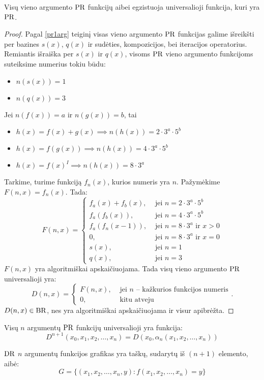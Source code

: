 \begin{prop}
  Visų vieno argumento $\mathop{\text{PR}}$ funkcijų aibei egzistuoja universalioji
  funkcija, kuri yra $\mathop{\text{PR}}$.
  \begin{proof}
    Pagal \ref{pr1arg} teiginį visas vieno argumento $\mathop{\text{PR}}$ funkcijas
    galime išreikšti per bazines $s(x)$, $q(x)$ ir sudėties, kompozicijos,
    bei iteracijos operatorius.
    Remiantis išraiška per $s(x)$ ir $q(x)$, visoms $\mathop{\text{PR}}$ vieno argumento
    funkcijoms suteiksime numerius tokiu būdu:
    \begin{itemize}
      \item $n(s(x)) = 1$
      \item $n(q(x)) = 3$
    \end{itemize}
    Jei $n(f(x)) = a$ ir $n(g(x)) = b$, tai
    \begin{itemize}
      \item $h(x) = f(x) + g(x) \implies n(h(x)) = 2 \cdot 3^a \cdot 5^b$
      \item $h(x) = f(g(x)) \implies n(h(x)) = 4 \cdot 3^a \cdot 5^b$
      \item $h(x) = f(x)^{I} \implies n(h(x)) = 8 \cdot 3^a$
    \end{itemize}
    Tarkime, turime funkciją $f_{n}(x)$, kurios numeris yra $n$. 
    Pažymėkime $F(n,x) = f_{n}(x)$. Tada:
    \[
    F(n,x) =%
    \begin{cases}
      f_{a}(x) + f_{b}(x), & \text{ jei } n = 2\cdot3^a\cdot5^b \\
      f_{a}(f_{b}(x)), & \text{ jei } n = 4\cdot3^a\cdot5^b \\
      f_{a}(f_{n}(x-1)), & \text{ jei } n = 8\cdot3^a \text{ ir } x > 0 \\
      0, & \text{ jei } n = 8\cdot3^a \text{ ir } x = 0 \\
      s(x), & \text{ jei } n = 1 \\
      q(x), & \text{ jei } n = 3
    \end{cases}
    \]
    $F(n,x)$ yra algoritmiškai apskaičiuojama. Tada visų vieno argumento
    $\mathop{\text{PR}}$ universalioji yra:
    \[
    D(n,x) =%
    \begin{cases}
      F(n,x), & \text{ jei $n$ – kažkurios funkcijos numeris} \\
      0, & \text{ kitu atveju }
    \end{cases}.
    \]
    $D(n,x) \in \mathop{\text{BR}}$, nes yra algoritmiškai apskaičiuojama ir visur 
    apibrėžta.
  \end{proof}
\end{prop}

\begin{prop}
  Visų $n$ argumentų $\mathop{\text{PR}}$ funkcijų universalioji yra funkcija:
  \[
  D^{n+1}(x_0,x_1,x_2,\dotsc,x_n) = D(x_0,\alpha_n(x_1,x_2,\dotsc,x_n))
  \]
\end{prop}

\begin{defn}
  $\mathop{\text{DR}}$ $n$ argumentų funkcijos grafikas yra taškų, sudarytų iš 
  $(n+1)$ elemento, aibė:
  \[
  G = \{ (x_1,x_2,\dotsc,x_n,y): f(x_1,x_2,\dotsc,x_n) = y \}
  \]
\end{defn}


